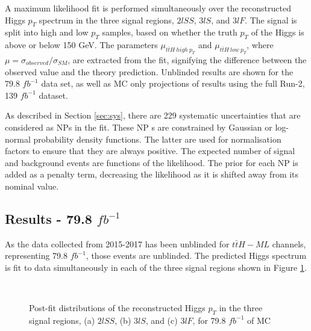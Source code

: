 A maximum likelihood fit is performed simultaneously over the reconstructed Higgs $p_T$ spectrum in the three signal regions, $2lSS$, $3lS$, and $3lF$. The signal is split into high and low $p_T$ samples, based on whether the truth $p_T$ of the Higgs is above or below 150 GeV. The parameters $\mu_{t\bar{t}H\ high\ p_T}$ and $\mu_{t\bar{t}H\ low\ p_T}$, where $\mu = \sigma_{observed}/\sigma_{SM} $, are extracted from the fit, signifying the difference between the observed value and the theory prediction. Unblinded results are shown for the 79.8 $fb^{-1}$ data set, as well as MC only projections of results using the full Run-2, 139 $fb^{-1}$ dataset.

As described in Section \ref{sec:sys}, there are 229 systematic uncertainties that are considered as NPs in the fit. These NP s are constrained by Gaussian or log-normal probability density functions. The latter are used for normalisation factors to ensure that they are always positive. The expected number of signal and background events are functions of the likelihood. The prior for each NP is added as a penalty term, decreasing the likelihood as it is shifted away from its nominal value.

\subsection{Results - 79.8 $fb^{-1}$}
\label{sec:res80}

As the data collected from 2015-2017 has been unblinded for $t\bar{t}H-ML$ channels, representing 79.8 $fb^{-1}$, those events are unblinded. The predicted Higgs \pt spectrum is fit to data simultaneously in each of the three signal regions shown in Figure \ref{fig:sigRegions80}.

\begin{figure}[H]
    \centering
    \\
    \caption{Post-fit distributions of the reconstructed Higgs $p_T$ in the three signal regions, (a) $2lSS$, (b) $3lS$, and (c) $3lF$, for 79.8 $fb^{-1}$ of MC}
    \label{fig:sigRegions80}
\end{figure}

